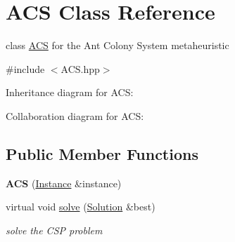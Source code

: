 \hypertarget{classACS}{}\section{A\+CS Class Reference}
\label{classACS}


class \hyperlink{classACS}{A\+CS} for the Ant Colony System metaheuristic  




{\ttfamily \#include $<$A\+C\+S.\+hpp$>$}



Inheritance diagram for A\+CS\+:


Collaboration diagram for A\+CS\+:
\subsection*{Public Member Functions}
\begin{DoxyCompactItemize}
\item 
{\bfseries A\+CS} (\hyperlink{classInstance}{Instance} \&instance)\hypertarget{classACS_aaa5e05d45ead3655754aa7df3c0e005c}{}\label{classACS_aaa5e05d45ead3655754aa7df3c0e005c}

\item 
virtual void \hyperlink{classACS_a6629ce98a1027c8d548357c068291f7a}{solve} (\hyperlink{classSolution}{Solution} \&best)
\begin{DoxyCompactList}\small\item\em solve the C\+SP problem \end{DoxyCompactList}\end{DoxyCompactItemize}
